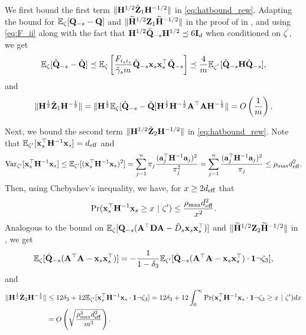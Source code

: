 \documentclass[11pt,a4paper]{article}
\begin{document}
We first bound the first term $\|\mathbf{H}^{1/2}\check{\mathbf{Z}}_1\mathbf{H}^{-1/2}\|$ in \eqref{eq:hatbound_rew}.
Adapting the bound for ${\mathbb{E}}_{\zeta}[\mathbf{Q}_{-s}-\mathbf{Q}]$ and $\|\widetilde{\mathbf{H}}^{1/2}\mathbf{Z}_1\widetilde{\mathbf{H}}^{-1/2}\|$ in the proof of  in , and using \eqref{eq:F_ii} along with the fact that $\mathbf{H}^{1/2}  \check{\mathbf{Q}}_{-s}\mathbf{H}^{1/2}\preceq 6\mathbf{I}_d$ when conditioned on $\zeta^{'}$, we get 
\begin{align}
{\mathbb{E}}_{\zeta}[  \check{\mathbf{Q}}_{-s}-  \check{\mathbf{Q}}]\preceq  {\mathbb{E}}_{\zeta} \left[\frac{F_{i_si_s}}{\check \gamma_s m}  \check{\mathbf{Q}}_{-s}\mathbf{x}_s\mathbf{x}^\top_s  \check{\mathbf{Q}}_{-s} \right] \preceq \frac{4}{m}{\mathbb{E}}_{\zeta^{'}}[  \check{\mathbf{Q}}_{-s}\mathbf{H}  \check{\mathbf{Q}}_{-s}],\label{eq:Q_diffe_hat}
\end{align} 
and 
\begin{align}
\|\mathbf{H}^{\frac{1}{2}}\check{\mathbf{Z}}_1\mathbf{H}^{-\frac{1}{2}}\|= \|\mathbf{H}^{\frac{1}{2}}{\mathbb{E}}_{\zeta}[ \check{\mathbf{Q}}_{-s}- \check{\mathbf{Q}}]\mathbf{H}^{\frac{1}{2}}\mathbf{H}^{-\frac{1}{2}}\mathbf{A}^\top\mathbf{A}\mathbf{H}^{-\frac{1}{2}}\|=O\left(\frac{1}{m}\right).\nonumber
\end{align}

 Next, we bound the second term $\|\mathbf{H}^{1/2}\check{\mathbf{Z}}_2\mathbf{H}^{-1/2}\|$ in \eqref{eq:hatbound_rew}. 
 Note that ${\mathbb{E}}_{\zeta'}[\mathbf{x}_s^\top\mathbf{H}^{-1}\mathbf{x}_s]=d_{\mathrm{eff}}$ and 
\begin{align}
 \operatorname{Var}_{\zeta'}[\mathbf{x}_s^\top\mathbf{H}^{-1}\mathbf{x}_s] \leq {\mathbb{E}}_{\zeta'}[(\mathbf{x}_s^\top\mathbf{H}^{-1}\mathbf{x}_s)^2]=\sum^n_{j=1}\pi_j\frac{(\mathbf{a}_j^\top\mathbf{H}^{-1}\mathbf{a}_j)^2}{\pi^2_j}=\sum^n_{j=1}\frac{(\mathbf{a}_j^\top\mathbf{H}^{-1}\mathbf{a}_j)^2}{\pi_j}\leq\rho_{\max} d^2_{\mathrm{eff}}.\nonumber
\end{align}
Then, using Chebyshev's inequality, we have, for $x\geq 2d_{\mathrm{eff}}$ that
\begin{align}
\Pr(\mathbf{x}_s^\top\mathbf{H}^{-1}\mathbf{x}_s\geq x~|~\zeta')\leq \frac{\rho_{\max} d^2_{\mathrm{eff}}}{x^2}. \nonumber
\end{align}
Analogous  to the bound on ${\mathbb{E}}_{\zeta}[\mathbf{Q}_{-s}(\mathbf{A}^\top\mathbf{D}\mathbf{A}-\tilde D_{s}\mathbf{x}_s\mathbf{x}^\top_s)]$ and $ \|\widetilde{\mathbf{H}}^{1/2}\mathbf{Z}_2\widetilde{\mathbf{H}}^{-1/2}\|$ in ,  we get
 \begin{align} 
      {\mathbb{E}}_{\zeta}[ \check{\mathbf{Q}}_{-s}(\mathbf{A}^\top\mathbf{A}-\mathbf{x}_s\mathbf{x}^\top_s)]=-\frac{1}{1-\delta_3}{\mathbb{E}}_{\zeta'}[ \check{\mathbf{Q}}_{-s}(\mathbf{A}^\top\mathbf{A}-\mathbf{x}_s\mathbf{x}^\top_s)\cdot\mathbf{1}\neg\zeta_3],\nonumber
 \end{align}
and 
\begin{align*}
\|\mathbf{H}^{\frac{1}{2}}\check{\mathbf{Z}}_2\mathbf{H}^{-\frac{1}{2}}\|&\leq 12 \delta_3+12 {\mathbb{E}}_{\zeta'}[\mathbf{x}_s^\top\mathbf{H}^{-1}\mathbf{x}_s\cdot\mathbf{1}
\neg\zeta_3]=12 \delta_3+12 \int^\infty_0 \Pr(\mathbf{x}_s^\top\mathbf{H}^{-1}\mathbf{x}_s\cdot \mathbf{1}\neg\zeta_3\geq x~|~\zeta')dx \\ 
&=O\left(\sqrt{\frac{\rho_{\max}^3 d^3_{\mathrm{eff}}}{m^3}}\right).
 \end{align*}
\end{document}
